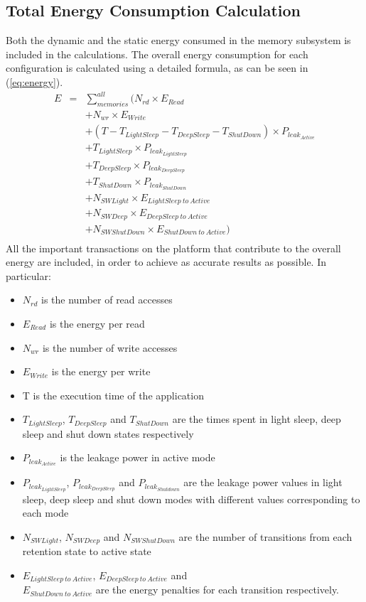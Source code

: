 \documentclass[smallextended]{svjour3}
\begin{document}
\subsection{Total Energy Consumption Calculation}
Both the dynamic and the static energy consumed in the memory subsystem is included in the calculations.
The overall energy consumption for each configuration is calculated using a detailed formula, as can be seen in (\ref{eq:energy}). 
\setlength{\arraycolsep}{0.0em}
\begin{eqnarray}
\label{eq:energy}
 E &{}= {}&\sum\limits_{memories}^{all}  ( N_{rd} \times E_{Read} \nonumber\\
		&&+ N_{wr} \times E_{Write} \nonumber\\
		&&+ (T - T_{LightSleep} - T_{DeepSleep} - T_{ShutDown}) \times P_{leak_{Active}} \nonumber\\
		&&+ T_{LightSleep} \times P_{leak_{LightSleep}} \nonumber\\
		&&+ T_{DeepSleep} \times P_{leak_{DeepSleep}} \nonumber\\
		&&+ T_{ShutDown} \times P_{leak_{ShutDown}} \nonumber\\ 
		&& + N_{SWLight} \times E_{LightSleep \: to \: Active} \nonumber\\
		&& + N_{SWDeep} \times E_{DeepSleep \: to \: Active} \nonumber\\
		&& + N_{SWShutDown} \times E_{ShutDown \: to \: Active} ) \nonumber\\
\end{eqnarray}
\setlength{\arraycolsep}{5pt}
All the important transactions on the platform that contribute to the overall energy are included, in order to achieve as accurate results as possible. In particular:
\begin{itemize}
\item $N_{rd}$ is the number of read accesses
\item $E_{Read}$ is the energy per read
\item $N_{wr}$ is the number of write accesses 
\item $E_{Write}$ is the energy per write 
\item T is the execution time of the application
\item $T_{LightSleep}$, $T_{DeepSleep}$ and $T_{ShutDown}$ are the times spent in light sleep, deep sleep and shut down states respectively
\item $P_{leak_{Active}}$ is the leakage power in active mode 
\item $P_{leak_{LightSleep}}$, $P_{leak_{DeepSleep}}$ and $P_{leak_{Shutdown}}$ are the leakage power values in light sleep, deep sleep and shut down modes with different values corresponding to each mode 
\item $N_{SWLight}$, $N_{SWDeep}$ and $N_{SWShutDown}$ are the number of transitions from each retention state to active state
\item $E_{LightSleep \: to \: Active}$, $E_{DeepSleep \: to \: Active}$ and \\ $E_{ShutDown \: to \: Active}$  are the energy penalties for each transition respectively.
\end{itemize}
\end{document}
